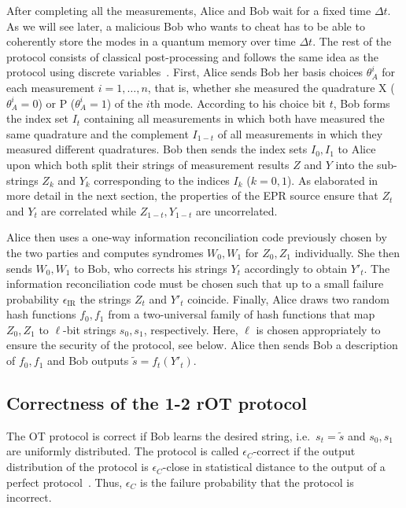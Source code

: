 \documentclass[aps,amsfonts,twoside,amssymb,superscriptaddress,twocolumn]{revtex4-1}
\newcommand*{\ec}{\textrm{IR}}
\begin{document}
After completing all the measurements, Alice and Bob wait for a fixed time $\Delta t$. As we will see later, a malicious Bob who wants to cheat has to be able to coherently store the modes in a quantum memory over time $\Delta t$. The rest of the protocol consists of classical post-processing and follows the same idea as the protocol using discrete variables~\cite{damgaard2007,schaffner2010}. First, Alice sends Bob her basis choices $\theta_A^i$ for each measurement $i=1,\ldots,n$, that is, whether she measured the quadrature X ($\theta_A^i=0$) or P ($\theta_A^i=1$) of the $i$th mode. According to his choice bit $t$, Bob forms the index set $I_t$ containing all measurements in which both have measured the same quadrature and the complement $I_{1-t}$ of all measurements in which they measured different quadratures. Bob then sends the index sets $I_0,I_1$ to Alice upon which both split their strings of measurement results $Z$ and $Y$ into the sub-strings $Z_k$ and $Y_k$ corresponding to the indices $I_k$ ($k=0,1$). As elaborated in more detail in the next section, the properties of the EPR source ensure that $Z_t$ and $Y_t$ are correlated while $Z_{1-t},Y_{1-t}$ are uncorrelated. 

Alice then uses a one-way information reconciliation code previously chosen by the two parties and computes syndromes $W_0,W_1$ for $Z_0,Z_1$ individually. She then sends $W_0,W_1$ to Bob, who corrects his strings $Y_t$ accordingly to obtain $Y'_t$. The information reconciliation code must be chosen such that up to a small failure probability $\epsilon_{\ec}$ the strings $Z_t$ and $Y'_t$ coincide. Finally, Alice draws two random hash functions $f_0,f_1$ from a two-universal family of hash functions that map $Z_0,Z_1$ to $\ell$-bit strings $s_0,s_1$, respectively. Here, $\ell$ is chosen appropriately to ensure the security of the protocol, see below. Alice then sends Bob a description of $f_0,f_1$ and Bob outputs $\tilde s=f_t(Y'_t)$.  


\subsection{Correctness of the 1-2 rOT protocol} 
 
The OT protocol is correct if Bob learns the desired string, i.e.\ $s_t = \tilde s$ and $s_0,s_1$ are uniformly distributed. 
The protocol is called $\epsilon_C$-correct if the output distribution of the protocol is $\epsilon_C$-close in statistical distance to the output of a perfect protocol~\cite{Koenig2012}.
Thus, $\epsilon_C$ is the failure probability that the protocol is incorrect.
\end{document}
